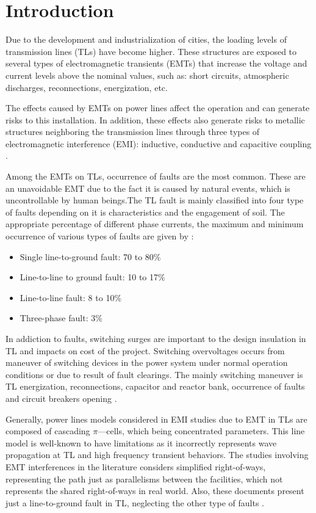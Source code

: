 \documentclass[5p,twocolumn]{elsarticle}
\begin{document}
\linenumbers

\section{Introduction}

Due to the development and industrialization of cities, the loading levels of transmission lines (TLs) have become higher. These structures are exposed to several types of electromagnetic transients (EMTs) that increase the voltage and current levels above the nominal values, such as: short circuits, atmospheric discharges, reconnections, energization, etc. 

The effects caused by EMTs on power lines affect the operation and can generate risks to this installation. In addition, these effects also generate risks to metallic structures neighboring the transmission lines through three types of electromagnetic interference (EMI): inductive, conductive and capacitive coupling \cite{CIGREWG36}.



Among the EMTs on TLs, occurrence of faults are the most common. These are an unavoidable EMT due to the fact it is caused by natural events, which is uncontrollable by human beings.The TL fault is mainly classified into four type of faults depending on it is characteristics and the engagement of soil. The appropriate percentage of different phase currents, the maximum and minimum occurrence of various types of faults are given by \cite{Nithyavelam2018}:

\begin{itemize}
	\item Single line-to-ground fault: 70 to 80\%
	\item Line-to-line to ground fault: 10 to 17\%
	\item Line-to-line fault: 8 to 10\%
	\item Three-phase fault: 3\% 
\end{itemize} 

In addiction to faults, switching surges are important to the design insulation in TL and impacts on cost of the project. Switching overvoltages occurs from maneuver of switching devices in the power system under normal operation conditions or due to result of fault clearings. The mainly switching maneuver is TL energization, reconnections, capacitor and reactor bank, occurrence of faults and circuit breakers opening \cite{Ibrahim2005,Hamza2019}.

Generally, power lines models considered in EMI studies due to EMT in TLs are composed of cascading $\pi$—cells, which being concentrated parameters. This line model is well-known to have limitations as it incorrectly represents wave propagation at TL and high frequency transient behaviors. The studies involving EMT interferences in the literature considers simplified right-of-ways, representing the path just as parallelisms between the facilities, which not represents the shared right-of-ways in real world. Also, these documents present just a line-to-ground fault in TL, neglecting the other type of faults \cite{Christoforidis2003,Qi2013,Wu2017,Alexandru2020}.  
\end{document}
